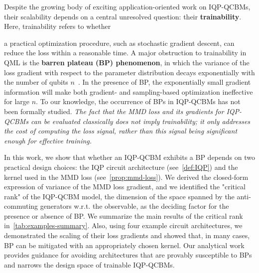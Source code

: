 \documentclass{article}
\theoremstyle{plain}
\theoremstyle{definition}
\theoremstyle{remark}
\begin{document}

Despite the growing body of exciting application-oriented work on IQP-QCBMs, their scalability depends on a central unresolved question: their \textbf{trainability}. 
Here, trainability refers to whether 
\begin{table}
\centering

\vspace{0.6cm}
\end{table}
a practical optimization procedure, such as stochastic gradient descent, can reduce the loss within a reasonable time. 
A major obstruction to trainability in QML is the \textbf{barren plateau (BP) phenomenon}, in which the variance of the loss gradient with respect to the parameter distribution decays exponentially with the number of qubits $n$~\citep{mcclean18,Cerezo21,Holmes22,Larocca25}. In the presence of BP, the exponentially small gradient information will make both gradient- and sampling-based optimization ineffective for large $n$. To our knowledge, the occurrence of BPs in IQP-QCBMs has not been formally studied. \emph{The fact that the MMD loss and its gradients for IQP-QCBMs can be evaluated classically does not imply trainability; it only addresses the cost of computing the loss signal, rather than this signal being significant enough for effective training.} 

In this work, we show that whether an IQP-QCBM exhibits a BP depends on two practical design choices: the IQP circuit architecture (see~\cref{def:IQP}) and the kernel used in the MMD loss (see~\cref{prop:mmd-loss}). We derived the closed-form expression of variance of the MMD loss gradient, and we identified the "critical rank" of the IQP-QCBM model, the dimension of the space spanned by the anti-commuting generators w.r.t. the observable, as the deciding factor for the presence or absence of BP. We summarize the main results of the critical rank in~\cref{tab:examples-summary}. Also, using four example circuit architectures, we demonstrated the scaling of their loss gradients and showed that, in many cases, BP can be mitigated with an appropriately chosen kernel. Our analytical work provides guidance for avoiding architectures that are provably susceptible to BPs and narrows the design space of trainable IQP-QCBMs.
\end{document}
